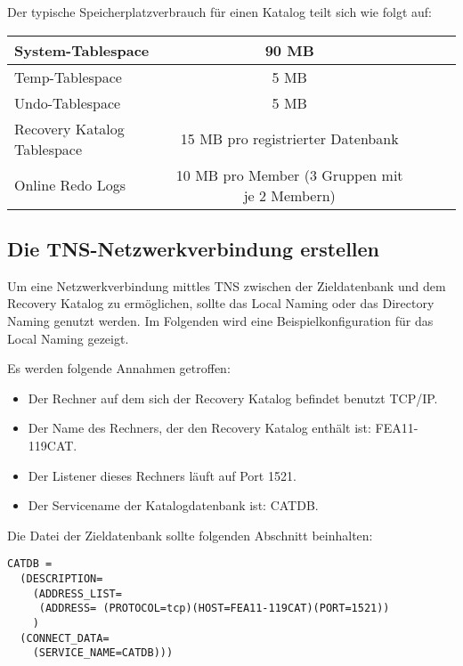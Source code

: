         Der typische Speicherplatzverbrauch f\"ur einen Katalog teilt sich wie folgt auf:
        \begin{center}
          \tabletail{%
            \hline
          }
          \begin{supertabular}[h]{|l|c|c|c|p{7cm}|}
          System-Tablespace & 90 MB \\
          \hline
          Temp-Tablespace & 5 MB \\
          \hline
          Undo-Tablespace & 5 MB \\
          \hline
          Recovery Katalog Tablespace & 15 MB pro registrierter Datenbank \\
          \hline
          Online Redo Logs & 10 MB pro Member (3 Gruppen mit je 2 Membern) \\
          \end{supertabular}
        \end{center}
\clearpage
      \subsection{Die TNS-Netzwerkverbindung erstellen}
        Um eine Netzwerkverbindung mittles TNS zwischen der Zieldatenbank und dem Recovery Katalog zu erm\"oglichen, sollte das Local Naming oder das Directory Naming genutzt werden. Im Folgenden wird eine Beispielkonfiguration f\"ur das Local Naming gezeigt.

        Es werden folgende Annahmen getroffen:
        \begin{itemize}
          \item Der Rechner auf dem sich der Recovery Katalog befindet benutzt TCP/IP.
          \item Der Name des Rechners, der den Recovery Katalog enth\"alt ist: FEA11-119CAT.
          \item Der Listener dieses Rechners l\"auft auf Port 1521.
          \item Der Servicename der Katalogdatenbank ist: CATDB.
        \end{itemize}
        Die Datei  der Zieldatenbank sollte folgenden Abschnitt beinhalten:
        \begin{lstlisting}[caption={Der Net Service Name der CATDB},label=admin1200,language=configfile]
CATDB =
  (DESCRIPTION=
    (ADDRESS_LIST=
     (ADDRESS= (PROTOCOL=tcp)(HOST=FEA11-119CAT)(PORT=1521))
    )
  (CONNECT_DATA=
    (SERVICE_NAME=CATDB)))
        \end{lstlisting}
